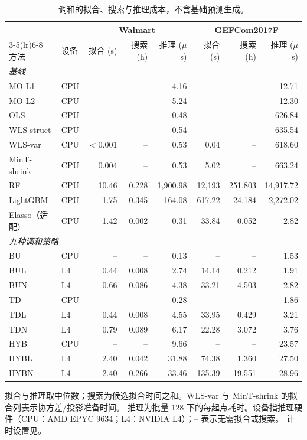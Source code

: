 \begin{table}[htbp]
\centering
\caption{调和的拟合、搜索与推理成本，不含基础预测生成。}
\label{tab:cost}
\begingroup
\renewcommand{\baselinestretch}{1.05}\fontsize{8.5}{10}\selectfont
\setlength{\tabcolsep}{3.5pt}
\renewcommand{\arraystretch}{1.06}
\begin{tabular*}{\textwidth}{@{\extracolsep{\fill}}llrrrrrr@{}}
\toprule
 & & \multicolumn{3}{c}{Walmart} & \multicolumn{3}{c}{GEFCom2017F} \\
\cmidrule(lr){3-5}\cmidrule(lr){6-8}
方法 & 设备 & 拟合 (s) & 搜索 (h) & 推理 ($\mu$s) & 拟合 (s) & 搜索 (h) & 推理 ($\mu$s) \\
\midrule
\multicolumn{8}{l}{\textit{基线}} \\
\addlinespace[2pt]
MO-L1 & CPU & -- & -- & 4.16 & -- & -- & 12.71 \\
MO-L2 & CPU & -- & -- & 5.24 & -- & -- & 12.30 \\
OLS & CPU & -- & -- & 0.48 & -- & -- & 626.84 \\
WLS-struct & CPU & -- & -- & 0.54 & -- & -- & 635.54 \\
WLS-var & CPU & $<0.001$ & -- & 0.53 & 0.04 & -- & 618.60 \\
MinT-shrink & CPU & 0.004 & -- & 0.53 & 5.02 & -- & 663.24 \\
RF & CPU & 10.46 & 0.228 & 1,900.98 & 12,193 & 251.803 & 14,917.72 \\
LightGBM & CPU & 1.75 & 0.345 & 164.08 & 617.22 & 24.184 & 2,272.02 \\
Elasso（适配） & CPU & 1.42 & 0.002 & 0.31 & 33.84 & 0.052 & 2.82 \\
\midrule
\multicolumn{8}{l}{\textit{九种调和策略}} \\
\addlinespace[2pt]
BU & CPU & -- & -- & 0.13 & -- & -- & 1.53 \\
BUL & L4 & 0.44 & 0.008 & 2.74 & 14.14 & 0.212 & 1.91 \\
BUN & L4 & 0.66 & 0.086 & 4.38 & 33.21 & 4.503 & 2.82 \\
TD & CPU & -- & -- & 0.28 & -- & -- & 1.86 \\
TDL & L4 & 0.44 & 0.008 & 4.55 & 33.95 & 0.429 & 3.21 \\
TDN & L4 & 0.79 & 0.089 & 6.17 & 22.28 & 3.072 & 3.76 \\
HYB & CPU & -- & -- & 9.66 & -- & -- & 23.57 \\
HYBL & L4 & 2.40 & 0.042 & 31.88 & 74.38 & 1.360 & 27.50 \\
HYBN & L4 & 2.40 & 0.266 & 33.46 & 135.39 & 19.551 & 28.96 \\
\bottomrule
\end{tabular*}
\par\smallskip\begin{minipage}{\textwidth}\footnotesize
拟合与推理取中位数；搜索为候选拟合时间之和。WLS-var 与 MinT-shrink 的拟合列表示协方差/投影准备时间。
推理为批量 128 下的每起点耗时。设备指推理硬件（CPU：AMD EPYC 9634；L4：NVIDIA L4）；-- 表示无需拟合或搜索。
计时设置见。
\end{minipage}
\endgroup
\end{table}
